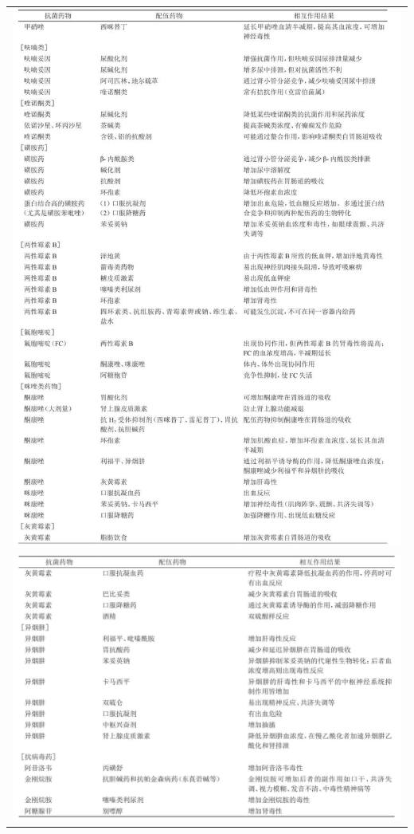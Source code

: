 \begin{longtable}{c}
 \includegraphics[width=\textwidth,height=\textheight,keepaspectratio]{./images/Image00602.jpg}\\
 \includegraphics[width=\textwidth,height=\textheight,keepaspectratio]{./images/Image00603.jpg}
 \end{longtable}



